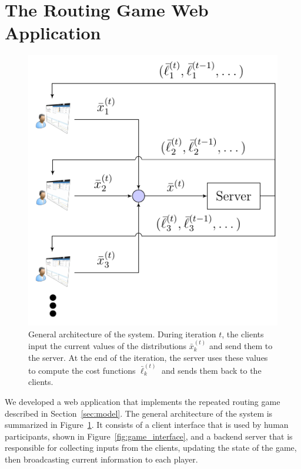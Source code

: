 \documentclass{sig-alternate-ipsn13}
\begin{document}
\section{The Routing Game Web Application}
\label{sec:experiment}
\begin{figure}[h!]
  \centering
  \includegraphics[width=.32\textwidth]{images/diagram.pdf}
  \caption{\footnotesize General architecture of the system. During iteration $t$, the clients input the current values of the distributions $\bar x^{(t)}_k$ and send them to the server. At the end of the iteration, the server uses these values to compute the cost functions $\bar \ell^{(t)}_k$ and sends them back to the clients.}
  \label{fig:system_block_diagram}
\end{figure}

We developed a web application that implements the repeated routing game described in Section~\ref{sec:model}. The general architecture of the system is summarized in Figure~\ref{fig:system_block_diagram}. It consists of a client interface that is used by human participants, shown in Figure~\ref{fig:game_interface}, and a backend server that is responsible for collecting inputs from the clients, updating the state of the game, then broadcasting current information to each player.



%
%
%
\end{document}
